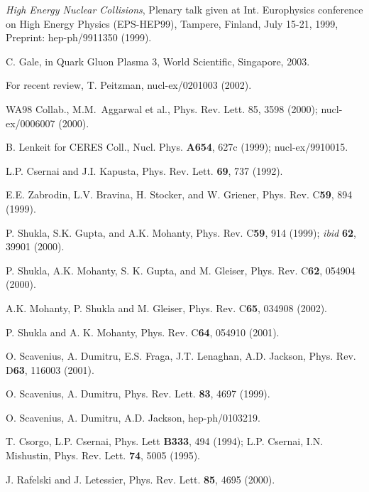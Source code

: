 \begin{thebibliography}{00}

 {\it High Energy Nuclear Collisions}, Plenary talk 
  given at Int. Europhysics conference on High Energy Physics 
  (EPS-HEP99), Tampere, Finland, July 15-21, 1999, 
  Preprint: hep-ph/9911350 (1999).
  
 C. Gale, in {Quark Gluon Plasma 3}, World Scientific,
         Singapore, 2003. 
         
 For recent review,  T. Peitzman, nucl-ex/0201003 (2002).

\bibitem{}

 WA98 Collab., M.M.\ Aggarwal et al., 
            Phys. Rev. Lett. 85, 3598 (2000); nucl-ex/0006007 (2000).

 B. Lenkeit for CERES Coll., 
        Nucl. Phys. {\bf A654}, 627c (1999); nucl-ex/9910015.

 L.P. Csernai and J.I. Kapusta, Phys. Rev. Lett. {\bf 69},
               737 (1992).

 E.E. Zabrodin, L.V. Bravina, H. Stocker, and W. Griener,
         Phys. Rev. C{\bf 59}, 894 (1999).

 P. Shukla, S.K. Gupta, and A.K. Mohanty,
         Phys. Rev. C{\bf 59}, 914 (1999); {\it ibid} {\bf 62}, 39901 (2000).

 P. Shukla, A.K. Mohanty, S. K. Gupta, and M. Gleiser,
              Phys. Rev. C{\bf 62}, 054904 (2000).

 A.K. Mohanty, P. Shukla and M. Gleiser,
              Phys. Rev. C{\bf 65}, 034908 (2002).
              
 P. Shukla and A. K. Mohanty, Phys. Rev. C{\bf 64},
        054910 (2001).              

 O. Scavenius, A. Dumitru, E.S. Fraga, J.T. Lenaghan,
         A.D. Jackson, Phys. Rev. D{\bf 63}, 116003 (2001).

 O. Scavenius, A. Dumitru,
         Phys. Rev. Lett. {\bf 83}, 4697 (1999).
         
 O. Scavenius, A. Dumitru, A.D. Jackson, 
          hep-ph/0103219.
          
 T. Csorgo, L.P. Csernai, Phys. Lett {\bf B333}, 494 (1994);
       L.P. Csernai, I.N. Mishustin, Phys. Rev. Lett. {\bf 74}, 5005 (1995).
       
 J. Rafelski and J. Letessier, Phys. Rev. Lett. {\bf 85},
                  4695 (2000).
         

\end{thebibliography}

